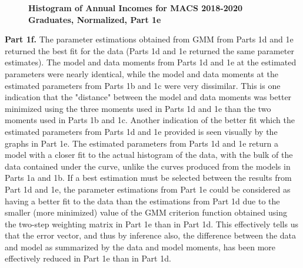 \documentclass[letterpaper,12pt]{article}
\theoremstyle{definition}
\begin{document}
\begin{figure}[htb]\centering\captionsetup{width=4.0in}
  \caption{\textbf{Histogram of Annual Incomes for MACS 2018-2020 Graduates, Normalized, Part 1e}}\label{FigPS3_1e}
\end{figure}

\noindent\newline\textbf{Part 1f.} The parameter estimations obtained from GMM from Parts 1d and 1e returned the best fit for the data (Parts 1d and 1e returned the same parameter estimates). The model and data moments from Parts 1d and 1e at the estimated parameters were nearly identical, while the model and data moments at the estimated parameters from Parts 1b and 1c were very dissimilar. This is one indication that the "distance" between the model and data moments was better minimized using the three moments used in Parts 1d and 1e than the two moments used in Parts 1b and 1c. Another indication of the better fit which the estimated parameters from Parts 1d and 1e provided is seen visually by the graphs in Part 1e. The estimated parameters from Parts 1d and 1e return a model with a closer fit to the actual histogram of the data, with the bulk of the data contained under the curve, unlike the curves produced from the models in Parts 1a and 1b. If a best estimation must be selected between the results from Part 1d and 1e, the parameter estimations from Part 1e could be considered as having a better fit to the data than the estimations from Part 1d due to the smaller (more minimized) value of the GMM criterion function obtained using the two-step weighting matrix in Part 1e than in Part 1d. This effectively tells us that the error vector, and thus by inference also, the difference between the data and model as summarized by the data and model moments, has been more effectively reduced in Part 1e than in Part 1d.
\end{document}
